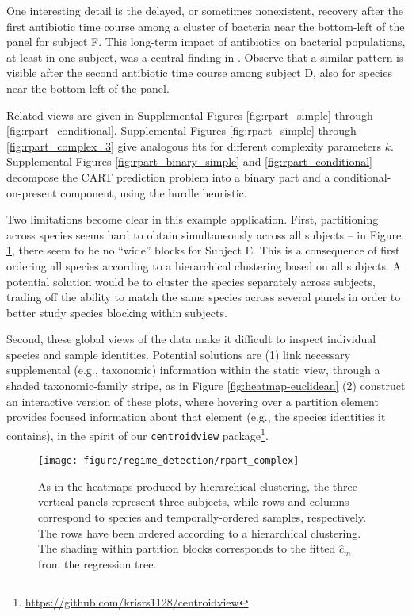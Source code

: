 One interesting detail is the delayed, or sometimes nonexistent, recovery after
the first antibiotic time course among a cluster of bacteria near the bottom-left of
the panel for subject F. This long-term impact of antibiotics on bacterial
populations, at least in one subject, was a central finding in
\cite{dethlefsen2011incomplete}. Observe that a similar pattern is visible after
the second antibiotic time course among subject D, also for species near the
bottom-left of the panel.

Related views are given in Supplemental Figures \ref{fig:rpart_simple} through
\ref{fig:rpart_conditional}. Supplemental Figures \ref {fig:rpart_simple}
through \ref{fig:rpart_complex_3} give analogous fits for different complexity
parameters $k$. Supplemental Figures \ref{fig:rpart_binary_simple} and
\ref{fig:rpart_conditional} decompose the CART prediction problem into a binary
part and a conditional-on-present component, using the hurdle heuristic.

Two limitations become clear in this example application. First, partitioning
across species seems hard to obtain simultaneously across all subjects -- in
Figure \ref{fig:rpart_complex}, there seem to be no ``wide'' blocks for Subject
E. This is a consequence of first ordering all species according to a
hierarchical clustering based on all subjects. A potential solution would be to
cluster the species separately across subjects, trading off the ability to match
the same species across several panels in order to better study species blocking
within subjects.

Second, these global views of the data make it difficult to inspect individual
species and sample identities. Potential solutions are (1) link necessary
supplemental (e.g., taxonomic) information within the static view, through a
shaded taxonomic-family stripe, as in Figure \ref{fig:heatmap-euclidean} (2)
construct an interactive version of these plots, where hovering over a partition
element provides focused information about that element (e.g., the species
identities it contains), in the spirit of our \texttt{centroidview}
package\footnote{\url{https://github.com/krisrs1128/centroidview}}.

\begin{figure}
  \centering
  \texttt{[image: figure/regime\_detection/rpart\_complex]}
  \caption{As in the heatmaps produced by hierarchical clustering, the three
    vertical panels represent three subjects, while rows and columns correspond
    to species and temporally-ordered samples, respectively. The rows have been
    ordered according to a hierarchical clustering. The shading within partition
    blocks corresponds to the fitted $\hat{c}_{m}$ from the regression tree.
    \label{fig:rpart_complex}
  }
\end{figure}

